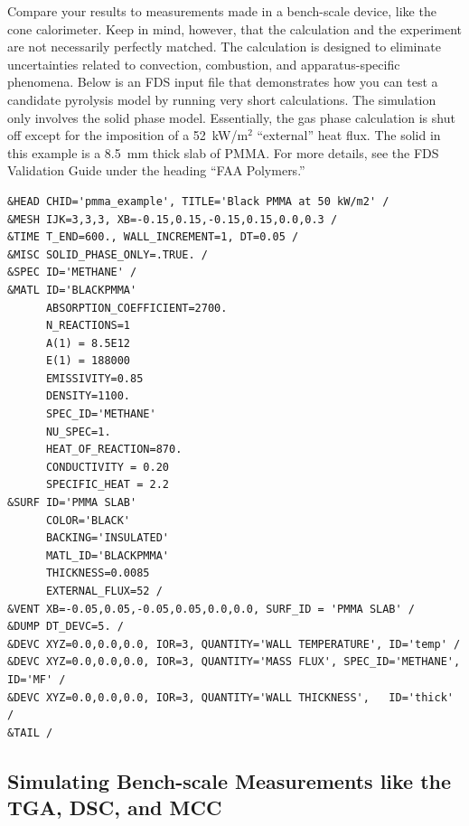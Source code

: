 \documentclass[11pt]{book}
\begin{document}
Compare your results to measurements made in a bench-scale device, like the cone calorimeter. Keep in mind, however, that the calculation and the experiment are not necessarily perfectly matched. The calculation is designed to eliminate uncertainties related to convection, combustion, and apparatus-specific phenomena. Below is an FDS input file that demonstrates how you can test a candidate pyrolysis model by running very short calculations. The simulation only involves the solid phase model. Essentially, the gas phase calculation is shut off except for the imposition of a 52~kW/m$^2$ ``external'' heat flux. The solid in this example is a 8.5~mm thick slab of PMMA. For more details, see the FDS Validation Guide under the heading ``FAA Polymers.''
\begin{lstlisting}
&HEAD CHID='pmma_example', TITLE='Black PMMA at 50 kW/m2' /
&MESH IJK=3,3,3, XB=-0.15,0.15,-0.15,0.15,0.0,0.3 /
&TIME T_END=600., WALL_INCREMENT=1, DT=0.05 /
&MISC SOLID_PHASE_ONLY=.TRUE. /
&SPEC ID='METHANE' /
&MATL ID='BLACKPMMA'
      ABSORPTION_COEFFICIENT=2700.
      N_REACTIONS=1
      A(1) = 8.5E12
      E(1) = 188000
      EMISSIVITY=0.85
      DENSITY=1100.
      SPEC_ID='METHANE'
      NU_SPEC=1.
      HEAT_OF_REACTION=870.
      CONDUCTIVITY = 0.20
      SPECIFIC_HEAT = 2.2
&SURF ID='PMMA SLAB'
      COLOR='BLACK'
      BACKING='INSULATED'
      MATL_ID='BLACKPMMA'
      THICKNESS=0.0085
      EXTERNAL_FLUX=52 /
&VENT XB=-0.05,0.05,-0.05,0.05,0.0,0.0, SURF_ID = 'PMMA SLAB' /
&DUMP DT_DEVC=5. /
&DEVC XYZ=0.0,0.0,0.0, IOR=3, QUANTITY='WALL TEMPERATURE', ID='temp' /
&DEVC XYZ=0.0,0.0,0.0, IOR=3, QUANTITY='MASS FLUX', SPEC_ID='METHANE', ID='MF' /
&DEVC XYZ=0.0,0.0,0.0, IOR=3, QUANTITY='WALL THICKNESS',   ID='thick' /
&TAIL /
\end{lstlisting}


\subsection{Simulating Bench-scale Measurements like the TGA, DSC, and MCC}
\label{info:TGA_DSC_MCC}
\end{document}
